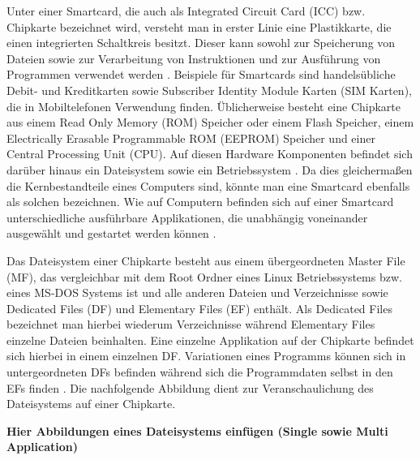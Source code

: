   Unter einer Smartcard, die auch als Integrated Circuit Card (ICC) bzw. Chipkarte bezeichnet wird, versteht man in erster Linie eine Plastikkarte, die einen integrierten Schaltkreis besitzt. Dieser kann sowohl zur Speicherung von Dateien sowie zur Verarbeitung von Instruktionen und zur Ausführung von Programmen verwendet werden \cite{lexikonSmartcard}. Beispiele für Smartcards sind handelsübliche Debit- und Kreditkarten sowie Subscriber Identity Module Karten (SIM Karten), die in Mobiltelefonen Verwendung finden. 
  Üblicherweise besteht eine Chipkarte aus einem Read Only Memory (ROM) Speicher oder einem Flash Speicher, einem Electrically Erasable Programmable ROM (EEPROM) Speicher und einer Central Processing Unit (CPU). Auf diesen Hardware Komponenten befindet sich darüber hinaus ein Dateisystem sowie ein Betriebssystem \cite{smartcasedElectricity}. Da dies gleichermaßen die Kernbestandteile eines Computers sind, könnte man eine Smartcard 
  ebenfalls als solchen bezeichnen. 
  Wie auf Computern befinden sich auf einer Smartcard unterschiedliche ausführbare Applikationen, die unabhängig voneinander ausgewählt und gestartet werden können \cite{smartcasedElectricity}. 
  
  Das Dateisystem einer Chipkarte besteht aus einem übergeordneten Master File (MF), das vergleichbar mit dem Root Ordner eines Linux Betriebssystems bzw. eines MS-DOS Systems ist und alle anderen Dateien und Verzeichnisse sowie Dedicated Files (DF) und Elementary Files (EF) enthält. Als Dedicated Files bezeichnet man hierbei wiederum Verzeichnisse während Elementary Files einzelne Dateien beinhalten. Eine einzelne Applikation auf der Chipkarte befindet sich hierbei in einem einzelnen DF. Variationen eines Programms können sich in untergeordneten DFs befinden während sich die Programmdaten selbst in den EFs finden \cite{smartcasedElectricity}. 
  Die nachfolgende Abbildung dient zur Veranschaulichung des Dateisystems auf einer Chipkarte. 
  
  \begin{center}
  	\textbf{Hier Abbildungen eines Dateisystems einfügen (Single sowie Multi Application)}
  \end{center}
 

